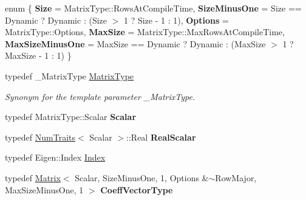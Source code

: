 \begin{DoxyCompactItemize}
\item 
\mbox{\label{class_eigen_1_1_tridiagonalization_aa533121325743d5a63a41934151f5435}} 
enum \{ \newline
{\bfseries Size} = Matrix\+Type\+::Rows\+At\+Compile\+Time, 
{\bfseries Size\+Minus\+One} = Size == Dynamic ? Dynamic \+: (Size $>$ 1 ? Size -\/ 1 \+: 1), 
{\bfseries Options} = Matrix\+Type\+::Options, 
{\bfseries Max\+Size} = Matrix\+Type\+::Max\+Rows\+At\+Compile\+Time, 
\newline
{\bfseries Max\+Size\+Minus\+One} = Max\+Size == Dynamic ? Dynamic \+: (Max\+Size $>$ 1 ? Max\+Size -\/ 1 \+: 1)
 \}
\item 
\mbox{\label{class_eigen_1_1_tridiagonalization_add0f4b2216d0ea8ee0f7d8525deaf0a9}} 
typedef \+\_\+\+Matrix\+Type \mbox{\hyperlink{class_eigen_1_1_tridiagonalization_add0f4b2216d0ea8ee0f7d8525deaf0a9}{Matrix\+Type}}
\begin{DoxyCompactList}\small\item\em Synonym for the template parameter {\ttfamily \+\_\+\+Matrix\+Type}. \end{DoxyCompactList}\item 
\mbox{\label{class_eigen_1_1_tridiagonalization_af3f9d8d46f2a1663013e207ff568b5f9}} 
typedef Matrix\+Type\+::\+Scalar {\bfseries Scalar}
\item 
\mbox{\label{class_eigen_1_1_tridiagonalization_a9d33e4c11dad35a8b147cbe048974700}} 
typedef \mbox{\hyperlink{struct_eigen_1_1_num_traits}{Num\+Traits}}$<$ Scalar $>$\+::Real {\bfseries Real\+Scalar}
\item 
typedef Eigen\+::\+Index \mbox{\hyperlink{class_eigen_1_1_tridiagonalization_a7bd1f9fccec1e93b77a2214b2d30aae9}{Index}}
\item 
\mbox{\label{class_eigen_1_1_tridiagonalization_ad8891a972b6b5c5588dc4109597d6b58}} 
typedef \mbox{\hyperlink{class_eigen_1_1_matrix}{Matrix}}$<$ Scalar, Size\+Minus\+One, 1, Options \&$\sim$Row\+Major, Max\+Size\+Minus\+One, 1 $>$ {\bfseries Coeff\+Vector\+Type}
\item 
\mbox{\label{class_eigen_1_1_tridiagonalization_aac5303dbff6921f9a1b9dad0cacfe00c}} 

\end{DoxyCompactItemize}
